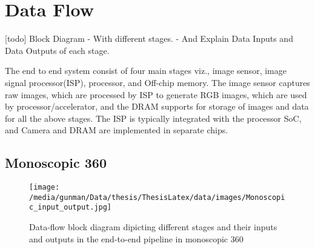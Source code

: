 \chapter{Data Flow}

[todo]
Block Diagram
- With different stages.
- And Explain Data Inputs and Data Outputs of each stage. 

The end to end system consist of four main stages viz., image sensor, image signal processor(ISP), processor, and Off-chip memory. The image sensor captures raw images, which are processed by ISP to generate RGB images, which are used by processor/accelerator, and the DRAM supports for storage of images and data for all the above stages. The ISP is typically integrated with the processor SoC, and Camera and DRAM are implemented in separate chips. 

\section{Monoscopic 360 }
\begin{figure}[h]
	\begin{center}
		\texttt{[image: /media/gunman/Data/thesis/ThesisLatex/data/images/Monoscopic\_input\_output.jpg]}
		\caption{Data-flow block diagram dipicting different stages and their inputs and outputs in the end-to-end pipeline in monoscopic 360}
		\label{Monoscopic_Input_Output}
	\end{center}
	\vspace{-0.3in}
\end{figure} 


